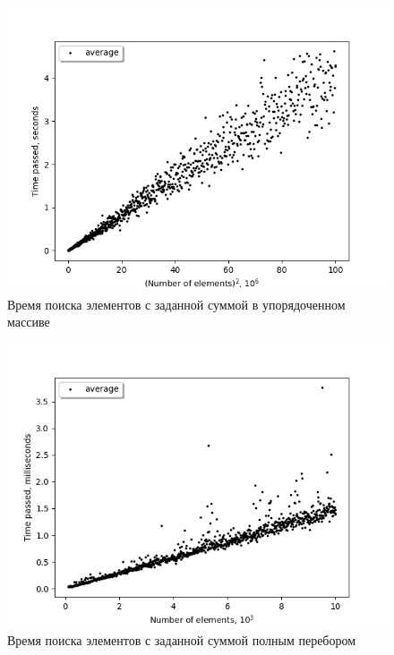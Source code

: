 \documentclass{article}
\begin{document}
\begin{figure}
\includegraphics{quad_sum.png}
\caption{Время поиска элементов с заданной суммой в упорядоченном массиве}
\end{figure}

\begin{figure}
\includegraphics{lin_sum.png}
\caption{Время поиска элементов с заданной суммой полным перебором}
\end{figure}
\end{document}
